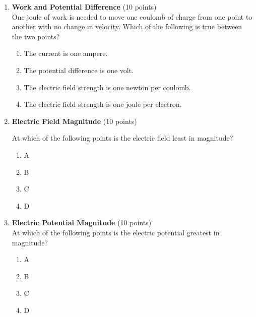 \begin{enumerate}
  \item \textbf{Work and Potential Difference} (10 points)\\
  One joule of work is needed to move one coulomb of charge from one point to another with no change in velocity. Which of the following is true between the two points?
  \begin{enumerate}[label=(\Alph*)]
    \item The current is one ampere.
    \item The potential difference is one volt.
    \item The electric field strength is one newton per coulomb.
    \item The electric field strength is one joule per electron.
  \end{enumerate}
  \begin{subanswer}
  \end{subanswer}

  \item \textbf{Electric Field Magnitude} (10 points)\\
  
  At which of the following points is the electric field least in magnitude?
  \begin{enumerate}[label=(\Alph*)]
    \item A
    \item B
    \item C
    \item D
  \end{enumerate}
  \begin{subanswer}
  \end{subanswer}

  \item \textbf{Electric Potential Magnitude} (10 points)\\
  At which of the following points is the electric potential greatest in magnitude?
  \begin{enumerate}[label=(\Alph*)]
    \item A
    \item B
    \item C
    \item D
  \end{enumerate}
  \begin{subanswer}
  \end{subanswer}


\end{enumerate}
